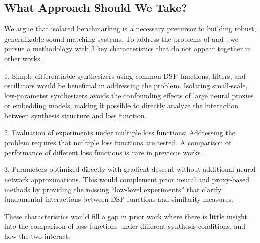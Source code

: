 \subsection{What Approach Should We Take?}
We argue that isolated benchmarking is a necessary precursor to building robust, generalizable sound-matching systems. To address the problems of \LossSelect{} and \SynthSelect{}, we pursue a methodology with 3 key characteristics that do not appear together in other works.

1. Simple differentiable synthesizers using common DSP functions, filters, and oscillators would be beneficial in addressing the \SynthSelect{} problem. Isolating small-scale, low-parameter synthesizers avoids the confounding effects of large neural proxies or embedding models, making it possible to directly analyze the interaction between synthesis structure and loss function. 

2. Evaluation of experiments under multiple loss functions: Addressing the \LossSelect{} problem requires that multiple loss functions are tested. A comparison of performance of different loss functions is rare in previous works~.  

3. Parameters optimized directly with gradient descent without additional neural network approximations. This would complement prior neural and proxy-based methods by providing the missing “low-level experiments” that clarify fundamental interactions between DSP functions and similarity measures. 

These characteristics would fill a gap in prior work where there is little insight into the comparison of loss functions under different synthesis conditions, and how the two interact. 
 







